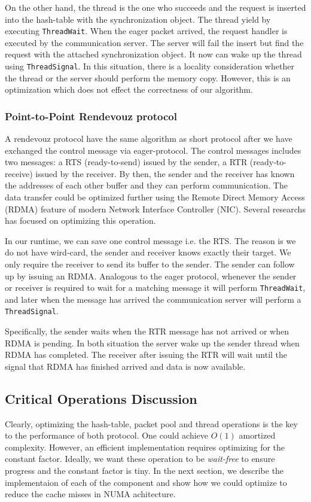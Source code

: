 \documentclass[11pt]{article}
\begin{document}
On the other hand, the thread is the one who succeeds and the request is
inserted into the hash-table with the synchronization object. The thread yield
by executing \texttt{ThreadWait}. When the eager packet arrived, the
request handler is executed by the communication server. The server will fail
the insert but find the request with the attached synchronization object. It
now can wake up the thread using \texttt{ThreadSignal}. In this situation,
there is a locality consideration whether the thread or the server should
perform the memory copy. However, this is an optimization which does not effect
the correctness of our algorithm.

\subsubsection{Point-to-Point Rendevouz protocol}
A rendevouz protocol have the same algorithm as short protocol after we have
exchanged the control message via eager-protocol. The control messages 
includes two messages: a RTS (ready-to-send) issued by the sender, a RTR
(ready-to-receive) issued by the receiver. By then, the sender and the receiver
has known the addresses of each other buffer and they can perform
communication.  The data transfer could be optimized further using the
Remote Direct Memory Access (RDMA) feature of modern Network Interface
Controller (NIC).  Several researchs has focused on optimizing this operation.

In our runtime, we can save one control message i.e. the RTS.  The reason is
we do not have wird-card, the sender and receiver knows exactly their target.
We only require the receiver to send its buffer to the sender. The sender can
follow up by issuing an RDMA.  Analogous to the eager protocol, whenever the
sender or receiver is required to wait for a matching message it will perform
\texttt{ThreadWait}, and later when the message has arrived the communication server
will perform a \texttt{ThreadSignal}.

Specifically, the sender waits when the RTR message has not arrived or when
RDMA is pending. In both situation the server wake up the sender thread when
RDMA has completed. The receiver after issuing the RTR will wait until the
signal that RDMA has finished arrived and data is now available.

\subsection{Critical Operations Discussion}
Clearly, optimizing the hash-table, packet pool and thread operations is the
key to the performance of both protocol. One could achieve $O(1)$ amortized
complexity.  However, an efficient implementation requires optimizing for the
constant factor. Ideally, we want these operation to be \textit{wait-free} to
ensure progress and the constant factor is tiny. In the next section, we
describe the implementaion of each of the component and show how we could
optimize to reduce the cache misses in NUMA achitecture.
\end{document}
